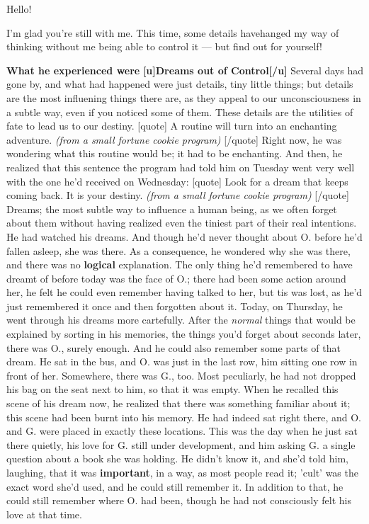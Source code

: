 Hello!

I'm glad you're still with me. This time, some details havehanged my way of thinking without me being able to control it --- but find out for yourself!

\textbf{What he experienced were}
\textbf{[u]Dreams out of Control[/u]}
Several days had gone by, and what had happened were just details, tiny little things; but details are the most influening things there are, as they appeal to our unconsciousness in a subtle way, even if you noticed some of them. These details are the utilities of fate to lead us to our destiny. 
[quote]
A routine will turn into an enchanting adventure. 
\emph{(from a small fortune cookie program)}
[/quote]
Right now, he was wondering what this routine would be; it had to be enchanting. And then, he realized that this sentence the program had told him on Tuesday went very well with the one he'd received on Wednesday: 
[quote]
Look for a dream that keeps coming back. It is your destiny. 
\emph{(from a small fortune cookie program)}
[/quote]
Dreams; the most subtle way to influence a human being, as we often forget about them without having realized even the tiniest part of their real intentions. He had watched his dreams. 
And though he'd never thought about O. before he'd fallen asleep, she was there. As a consequence, he wondered why she was there, and there was no \textbf{logical} explanation. The only thing he'd remembered to have dreamt of before today was the face of O.; there had been some action around her, he felt he could even remember having talked to her, but tis was lost, as he'd just remembered it once and then forgotten about it. 
Today, on Thursday, he went through his dreams more cartefully. After the \emph{normal} things that would be explained by sorting in his memories, the things you'd forget about seconds later, there was O., surely enough. And he could also remember some parts of that dream. 
He sat in the bus, and O. was just in the last row, him sitting one row in front of her. Somewhere, there was G., too. Most peculiarly, he had not dropped his bag on the seat next to him, so that it was empty. 
When he recalled this scene of his dream now, he realized that there was something familiar about it; this scene had been burnt into his memory. He had indeed sat right there, and O. and G. were placed in exactly these locations. This was the day when he just sat there quietly, his love for G. still under development, and him asking G. a single question about a book she was holding. He didn't know it, and she'd told him, laughing, that it was \textbf{important}, in a way, as most people read it; 'cult' was the exact word she'd used, and he could still remember it. In addition to that, he could still remember where O. had been, though he had not consciously felt his love at that time. 
